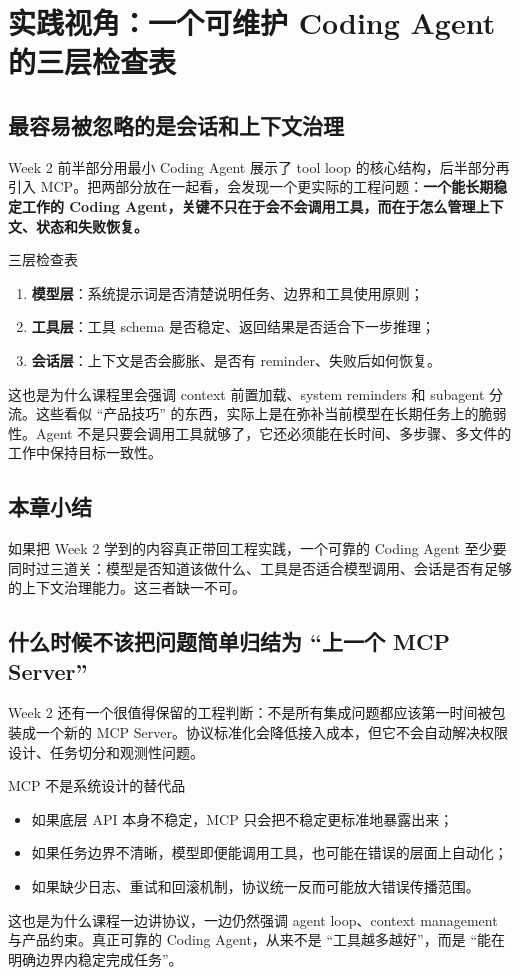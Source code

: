 \section{实践视角：一个可维护 Coding Agent 的三层检查表}

\subsection{最容易被忽略的是会话和上下文治理}
Week 2 前半部分用最小 Coding Agent 展示了 tool loop 的核心结构，后半部分再引入 MCP。把两部分放在一起看，会发现一个更实际的工程问题：\textbf{一个能长期稳定工作的 Coding Agent，关键不只在于会不会调用工具，而在于怎么管理上下文、状态和失败恢复。}

\begin{knowledgebox}{三层检查表}
\begin{enumerate}
    \item \textbf{模型层}：系统提示词是否清楚说明任务、边界和工具使用原则；
    \item \textbf{工具层}：工具 schema 是否稳定、返回结果是否适合下一步推理；
    \item \textbf{会话层}：上下文是否会膨胀、是否有 reminder、失败后如何恢复。
\end{enumerate}
\end{knowledgebox}

这也是为什么课程里会强调 context 前置加载、system reminders 和 subagent 分流。这些看似 ``产品技巧'' 的东西，实际上是在弥补当前模型在长期任务上的脆弱性。Agent 不是只要会调用工具就够了，它还必须能在长时间、多步骤、多文件的工作中保持目标一致性。

\subsection{本章小结}
如果把 Week 2 学到的内容真正带回工程实践，一个可靠的 Coding Agent 至少要同时过三道关：模型是否知道该做什么、工具是否适合模型调用、会话是否有足够的上下文治理能力。这三者缺一不可。

\subsection{什么时候不该把问题简单归结为 ``上一个 MCP Server''}
Week 2 还有一个很值得保留的工程判断：不是所有集成问题都应该第一时间被包装成一个新的 MCP Server。协议标准化会降低接入成本，但它不会自动解决权限设计、任务切分和观测性问题。

\begin{warningbox}{MCP 不是系统设计的替代品}
\begin{itemize}
    \item 如果底层 API 本身不稳定，MCP 只会把不稳定更标准地暴露出来；
    \item 如果任务边界不清晰，模型即便能调用工具，也可能在错误的层面上自动化；
    \item 如果缺少日志、重试和回滚机制，协议统一反而可能放大错误传播范围。
\end{itemize}
\end{warningbox}

这也是为什么课程一边讲协议，一边仍然强调 agent loop、context management 与产品约束。真正可靠的 Coding Agent，从来不是 ``工具越多越好''，而是 ``能在明确边界内稳定完成任务''。


